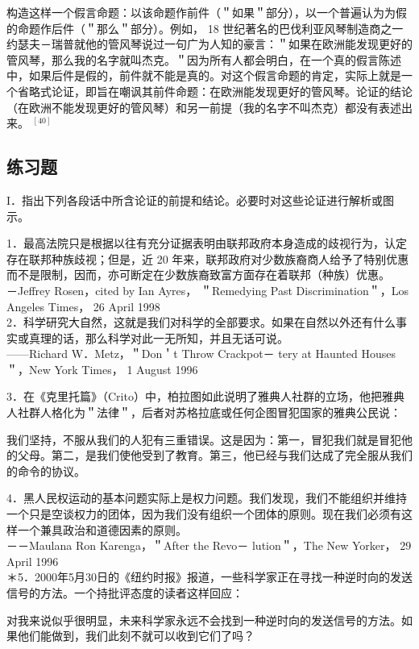 构造这样一个假言命题：以该命题作前件（＂如果＂部分），以一个普遍认为为假的命题作后件（＂那么＂部分）。例如， 18 世纪著名的巴伐利亚风琴制造商之一约瑟夫－瑞普就他的管风琴说过一句广为人知的豪言：＂如果在欧洲能发现更好的管风琴，那么我的名字就叫杰克。＂因为所有人都会明白，在一个真的假言陈述中，如果后件是假的，前件就不能是真的。对这个假言命题的肯定，实际上就是一个省略式论证，即旨在嘲讽其前件命题：在欧洲能发现更好的管风琴。论证的结论（在欧洲不能发现更好的管风琴）和另一前提（我的名字不叫杰克）都没有表述出来。 ${ }^{[40]}$

\subsection{练习题}
I．指出下列各段话中所含论证的前提和结论。必要时对这些论证进行解析或图示。

1．最高法院只是根据以往有充分证据表明由联邦政府本身造成的歧视行为，认定存在联邦种族歧视；但是，近 20 年来，联邦政府对少数族裔商人给予了特别优惠而不是限制，因而，亦可断定在少数族裔致富方面存在着联邦（种族）优惠。\\
－Jeffrey Rosen，cited by Ian Ayres， ＂Remedying Past Discrimination＂，Los Angeles Times， 26 April 1998\\
2．科学研究大自然，这就是我们对科学的全部要求。如果在自然以外还有什么事实或真理的话，那么科学对此一无所知，并且无话可说。\\
——Richard W．Metz，＂Don＇t Throw Crackpot－ tery at Haunted Houses＂，New York Times， 1 August 1996

3．在《克里托篇》（Crito）中，柏拉图如此说明了雅典人社群的立场，他把雅典人社群人格化为＂法律＂，后者对苏格拉底或任何企图冒犯国家的雅典公民说：

我们坚持，不服从我们的人犯有三重错误。这是因为：第一，冒犯我们就是冒犯他的父母。第二，是我们使他受到了教育。第三，他已经与我们达成了完全服从我们的命令的协议。

4．黑人民权运动的基本问题实际上是权力问题。我们发现，我们不能组织并维持一个只是空谈权力的团体，因为我们没有组织一个团体的原则。现在我们必须有这样一个兼具政治和道德因素的原则。\\
－－Maulana Ron Karenga，＂After the Revo－ lution＂，The New Yorker， 29 April 1996\\
＊5．2000年5月30日的《纽约时报》报道，一些科学家正在寻找一种逆时向的发送信号的方法。一个持批评态度的读者这样回应：

\begin{displayquote}
对我来说似乎很明显，未来科学家永远不会找到一种逆时向的发送信号的方法。如果他们能做到，我们此刻不就可以收到它们了吗？
\end{displayquote}

